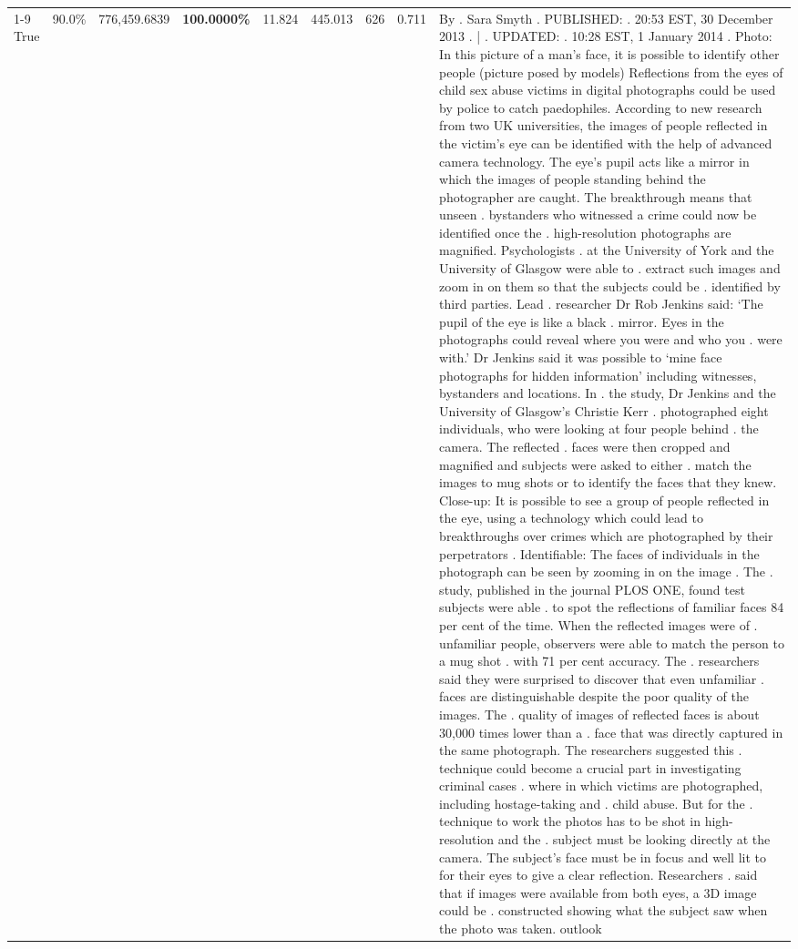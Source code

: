 \begin{table}[H]
\begin{tabular}{lllrlllll}
\cline{1-9}
True & 90.0\% & 776,459.6839 & \bfseries \color{red} 100.0000\% & 11.824 & 445.013 & 626 & 0.711 & By . Sara Smyth . PUBLISHED: . 20:53 EST, 30 December 2013 . | . UPDATED: . 10:28 EST, 1 January 2014 . Photo: In this picture of a man's face, it is possible to identify other people (picture posed by models) Reflections from the eyes of child sex abuse victims in digital photographs could be used by police to catch paedophiles. According to new research from two UK universities, the images of people reflected in the victim's eye can be identified with the help of advanced camera technology. The eye's pupil acts like a mirror in which the images of people standing behind the photographer are caught. The breakthrough means that unseen . bystanders who witnessed a crime could now be identified once the . high-resolution photographs are magnified. Psychologists . at the University of York and the University of Glasgow were able to . extract such images and zoom in on them so that the subjects could be . identified by third parties. Lead . researcher Dr Rob Jenkins said: ‘The pupil of the eye is like a black . mirror. Eyes in the photographs could reveal where you were and who you . were with.' Dr Jenkins said it was possible to ‘mine face photographs for hidden information' including witnesses, bystanders and locations. In . the study, Dr Jenkins and the University of Glasgow's Christie Kerr . photographed eight individuals, who were looking at four people behind . the camera. The reflected . faces were then cropped and magnified and subjects were asked to either . match the images to mug shots or to identify the faces that they knew. Close-up: It is possible to see a group of people reflected in the eye, using a technology which could lead to breakthroughs over crimes which are photographed by their perpetrators . Identifiable: The faces of individuals in the photograph can be seen by zooming in on the image . The . study, published in the journal PLOS ONE, found test subjects were able . to spot the reflections of familiar faces 84 per cent of the time. When the reflected images were of . unfamiliar people, observers were able to match the person to a mug shot . with 71 per cent accuracy. The . researchers said they were surprised to discover that even unfamiliar . faces are distinguishable despite the poor quality of the images. The . quality of images of reflected faces is about 30,000 times lower than a . face that was directly captured in the same photograph. The researchers suggested this . technique could become a crucial part in investigating criminal cases . where in which victims are photographed, including hostage-taking and . child abuse. But for the . technique to work the photos has to be shot in high-resolution and the . subject must be looking directly at the camera. The subject's face must be in focus and well lit to for their eyes to give a clear reflection. Researchers . said that if images were available from both eyes, a 3D image could be . constructed showing what the subject saw when the photo was taken. outlook \\

\end{tabular}
\end{table}

